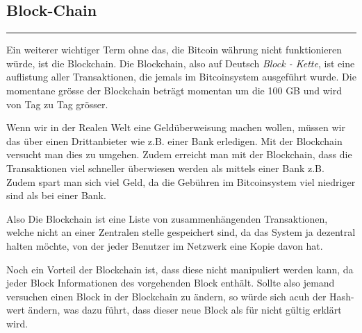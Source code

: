 \vspace*{1mm}
\subsection*{Block-Chain}
\vspace{-10mm}
\noindent\rule{0.8\textwidth}{0.4pt}

\vspace{5mm}

\noindent
Ein weiterer wichtiger Term ohne das, die Bitcoin währung nicht funktionieren würde, ist die Blockchain.
Die Blockchain, also auf Deutsch \emph{\dq Block - Kette\dq}, ist eine auflistung aller Transaktionen, die jemals im Bitcoinsystem ausgeführt wurde.
Die momentane grösse der Blockchain beträgt momentan um die 100 GB und wird von Tag zu Tag grösser.

\noindent
Wenn wir in der Realen Welt eine Geldüberweisung machen wollen, müssen wir das über einen Drittanbieter wie z.B. einer Bank erledigen. Mit der Blockchain
versucht man dies zu umgehen. Zudem erreicht man mit der Blockchain, dass die Transaktionen viel schneller überwiesen werden als mittels einer Bank z.B. Zudem
spart man sich viel Geld, da die Gebühren im Bitcoinsystem viel niedriger sind als bei einer Bank.

\noindent
Also Die Blockchain ist eine Liste von zusammenhängenden Transaktionen, welche nicht an  einer Zentralen stelle gespeichert sind, da das System ja dezentral halten möchte,
von der jeder Benutzer im Netzwerk eine Kopie davon hat.

\noindent
Noch ein Vorteil der Blockchain ist, dass diese nicht manipuliert werden kann, da jeder Block Informationen des vorgehenden Block enthält. Sollte also jemand versuchen einen Block in der Blockchain
zu ändern, so würde sich acuh der Hash-wert ändern, was dazu führt, dass dieser neue Block als für nicht gültig erklärt wird.

\newpage
